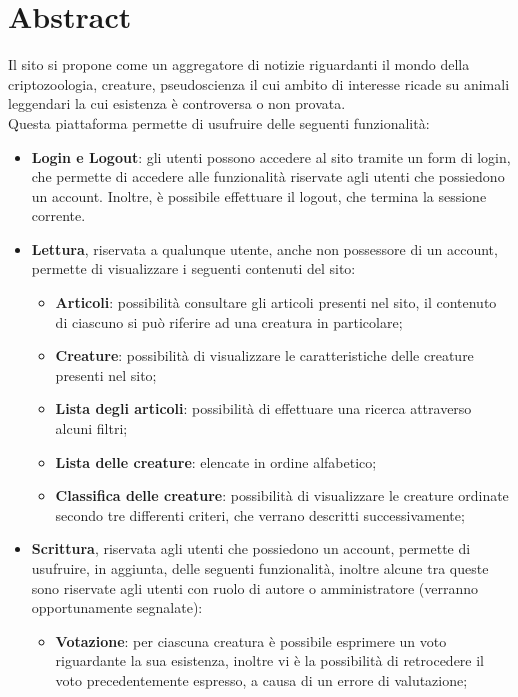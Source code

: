\section{Abstract}
\label{sec:abstract}
Il sito si propone come un aggregatore di notizie riguardanti il mondo della criptozoologia, creature, pseudoscienza il cui ambito di interesse ricade su animali leggendari la cui esistenza è controversa o non provata. \\
Questa piattaforma permette di usufruire delle seguenti funzionalità:
\begin{itemize}
    \item \textbf{Login e Logout}: gli utenti possono accedere al sito tramite un form di login, che permette di accedere alle funzionalità riservate agli utenti che possiedono un account. Inoltre, è possibile effettuare il logout, che termina la sessione corrente.
    \item \textbf{Lettura}, riservata a qualunque utente, anche non possessore di un account, permette di visualizzare i seguenti contenuti del sito:
    \begin{itemize}
        \item \textbf{Articoli}: possibilità consultare gli articoli presenti nel sito, il contenuto di ciascuno si può riferire ad una creatura in particolare;
        \item \textbf{Creature}: possibilità di visualizzare le caratteristiche delle creature presenti nel sito;
        \item \textbf{Lista degli articoli}: possibilità di effettuare una ricerca attraverso alcuni filtri;
        \item \textbf{Lista delle creature}: elencate in ordine alfabetico;
        \item \textbf{Classifica delle creature}: possibilità di visualizzare le creature ordinate secondo tre differenti criteri, che verrano descritti successivamente;
    \end{itemize}
    \item \textbf{Scrittura}, riservata agli utenti che possiedono un account, permette di usufruire, in aggiunta, delle seguenti funzionalità, inoltre alcune tra queste sono riservate agli utenti con ruolo di autore o amministratore (verranno opportunamente segnalate):
    \begin{itemize}
        \item \textbf{Votazione}: per ciascuna creatura è possibile esprimere un voto riguardante la sua esistenza, inoltre vi è la possibilità di retrocedere il voto precedentemente espresso, a causa di un errore di valutazione;

\end{itemize}
\end{itemize}
